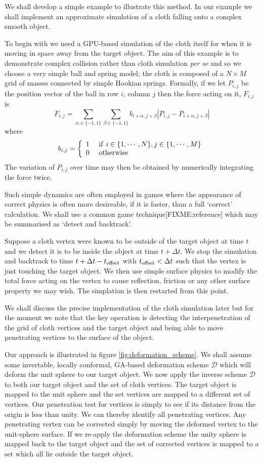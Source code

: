 We shall develop a simple example to illustrate this method. In our example we
shall implement an approximate simulation of a cloth falling onto a complex
smooth object. 

To begin with we need a GPU-based simulation of the cloth itself for when
it is moving in space away from the target object. The aim of this example is
to demonstrate complex collision rather than cloth simulation \emph{per se}
and so we choose a very simple ball and spring model; the cloth is composed
of a $N\times M$ grid of masses connected by simple Hookian springs. Formally, 
if we let $P_{i,j}$
be the position vector of the ball in row $i$, column $j$ then the force acting
on it, $F_{i,j}$ is
\[
F_{i,j} = \sum_{\alpha \in \{-1,1\}} \sum_{\beta \in \{-1,1\}} 
b_{i+\alpha, j+\beta} 
\left| P_{i,j} - P_{i+\alpha, j+\beta} \right|
\]
where
\[
b_{i,j} = 
\left\{
\begin{array}{ll}
1 & {\rm ~if~} i \in \{1, \cdots, N\}, j \in \{1, \cdots, M\} \\
0 & {\rm ~otherwise}
\end{array}
\right.
\]
The variation of $P_{i,j}$ over time may then be obtained by numerically
integrating the force twice.

Such simple dynamics are often employed in games where the appearance of
correct physics is often more desireable, if it is faster, than a full
`correct' calculation. We shall use a common game technique[FIXME:reference]
which may be summarised as `detect and backtrack'.

Suppose a cloth vertex were known to be outside of the target object at time
$t$ and we detect it is to be inside the object at time $t + \Delta t$. 
We stop the simulation and backtrack to time $t + \Delta t - t_{\rm offset}$
with $t_{\rm offset} < \Delta t$ such that the vertex is just touching
the target object. We then use simple surface physics to modify the total
force acting on the vertex to cause reflection, friction or any other 
surface property we may wish. The simplation is then restarted from this point.

We shall discuss the precise implementation of the cloth simulation later but
for the moment we note that the key operation is detecting the interpenetration
of the grid of cloth vertices and the target object and being able to move 
penetrating vertices to the surface of the object.

Our approach is illustrated in figure \ref{fig:deformation_scheme}. We shall
assume some invertable, locally conformal, GA-based deformation scheme
$\mathcal{D}$ which will deform the unit sphere to our target object.  We now
apply the inverse scheme $\mathcal{D}$ to both our target object and the set
of cloth vertices. The target object is mapped to the unit sphere and the set
vertices are mapped to a different set of vertices.  Our penetration test for
vertices is simply to see if its distance from the origin is less than unity.
We can thereby identify all penetrating vertices. Any penetrating vertex can
be corrected simply by moving the deformed vertex to the unit-sphere surface.
If we re-apply the deformation scheme the unity sphere is mapped back to the
target object and the set of corrected vertices is mapped to a set which all
lie outside the target object.

